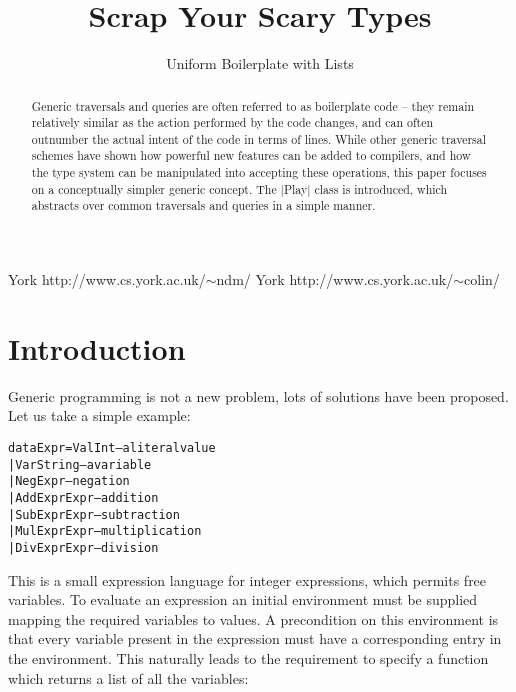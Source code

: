 \documentclass[preprint]{sigplanconf}
\newenvironment{code}{\begin{alltt}\small}{\end{alltt}}
\begin{document}
\copyrightdata{[to be supplied]}

\titlebanner{\today{} - \currenttime{}}        %
\preprintfooter{}   %

\title{Scrap Your Scary Types}
\subtitle{Uniform Boilerplate with Lists}

           {York}
           {http://www.cs.york.ac.uk/$\sim$ndm/}
           {York}
           {http://www.cs.york.ac.uk/$\sim$colin/}

\maketitle

\begin{abstract}
Generic traversals and queries are often referred to as boilerplate code -- they remain relatively similar as the action performed by the code changes, and can often outnumber the actual intent of the code in terms of lines. While other generic traversal schemes have shown how powerful new features can be added to compilers, and how the type system can be manipulated into accepting these operations, this paper focuses on a conceptually simpler generic concept. The |Play| class is introduced, which abstracts over common traversals and queries in a simple manner.
\end{abstract}

\section{Introduction}

Generic programming is not a new problem, lots of solutions have been proposed. Let us take a simple example:

\begin{code}
data Expr  =  Val  Int         -- a literal value
           |  Var  String      -- a variable
           |  Neg  Expr        -- negation
           |  Add  Expr  Expr  -- addition
           |  Sub  Expr  Expr  -- subtraction
           |  Mul  Expr  Expr  -- multiplication
           |  Div  Expr  Expr  -- division
\end{code}

This is a small expression language for integer expressions, which permits free variables. To evaluate an expression an initial environment must be supplied mapping the required variables to values. A precondition on this environment is that every variable present in the expression must have a corresponding entry in the environment. This naturally leads to the requirement to specify a function which returns a list of all the variables:
\end{document}
